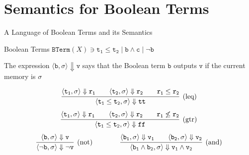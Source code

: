 \documentclass{beamer}
\begin{document}
\section{Semantics for Boolean Terms}

\begin{frame}{A Language of Boolean Terms and its Semantics}

        \begin{block}{Boolean Terms}
        $\mathtt{BTerm}(X) \ni \mathtt{t_1 \leq t_2} \mid \mathtt{b \wedge c}
        \mid \mathtt{\neg b}$
	\end{block}

        \pause
        The expression $\langle \mathtt{b},\sigma \rangle \Downarrow
        \mathtt{v}$ says that the Boolean term $\mathtt{b}$ outputs
        $\mathtt{v}$ if the current memory is $\sigma$

        \[
                \infer[(\text{leq})]
                { 
                        \langle \mathtt{t_1 \leq t_2}, \sigma \rangle \Downarrow \mathtt{tt} 
                }
                {
                        \langle \mathtt{t_1}, \sigma \rangle \Downarrow \mathtt{r_1} \qquad
                        \langle \mathtt{t_2}, \sigma \rangle \Downarrow \mathtt{r_2}
                        \qquad \mathtt{r_1 \leq r_2}
                } 
        \] 
        \[
                \infer[(\text{gtr})]
                { 
                        \langle \mathtt{t_1 \leq t_2}, \sigma \rangle \Downarrow \mathtt{ff} 
                }
                {
                        \langle \mathtt{t_1}, \sigma \rangle \Downarrow \mathtt{r_1} \qquad
                        \langle \mathtt{t_2}, \sigma \rangle \Downarrow \mathtt{r_2}
                        \qquad \mathtt{r_1 \not \leq r_2}
                }
        \]
        \[        
                \infer[(\text{not})]{  
                        \langle \mathtt{\neg \mathtt{b}}, \sigma \rangle \Downarrow 
                        \mathtt{\neg v}
                        }{
                        \langle \mathtt{b}, \sigma \rangle \Downarrow \mathtt{v}
                } \qquad \qquad
                \infer[(\text{and})]{  
                        \langle \mathtt{b_1} \wedge \mathtt{b_2}, \sigma \rangle \Downarrow 
                        \mathtt{v_1 \wedge v_2}
                        }{
                        \langle \mathtt{b_1}, \sigma \rangle \Downarrow \mathtt{v_1} \qquad
                        \langle \mathtt{b_2}, \sigma \rangle \Downarrow \mathtt{v_2}
                }
        \]
\end{frame}        
\end{document}
